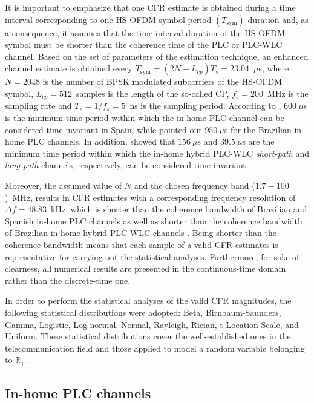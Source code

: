 \documentclass[journal]{IEEEtran}
\begin{document}
It is important to emphasize that one \ac{CFR} estimate is obtained during a time interval corresponding to one \ac{HS-OFDM} symbol period $(T_{\textrm{sym}})$ duration and, as a consequence, it assumes that the time interval duration of the \ac{HS-OFDM} symbol must be shorter than the coherence time of the \ac{PLC} or \ac{PLC}-\ac{WLC} channel. Based on the set of parameters of the estimation technique, an enhanced channel estimate is obtained every $T_{\textrm{sym}}=(2N + L_{cp}) T_s = 23.04$~$\mu$s, where $N=2048$ is the number of \ac{BPSK} modulated subcarriers of the \ac{HS-OFDM} symbol, $L_{cp}=512$~samples is the length of the so-called \ac{CP}, $f_s=200$~MHz is the sampling rate and $T_s=1/f_s=5$~ns is the sampling period. According to \cite{Canete:AIPLC}, $600~\mu$s is the minimum time period within which the in-home \ac{PLC} channel can be considered time invariant in Spain, while \cite{Thiago:Characterization} pointed out $950~\mu$s for the Brazilian in-home \ac{PLC} channels. In addition, \cite{thiago:hyb} showed that  $156~\mu$s and $39.5~\mu$s are the minimum time period within which the in-home hybrid \ac{PLC}-\ac{WLC} \textit{short-path} and \textit{long-path} channels, respectively, can be considered time invariant.

Moreover, the assumed value of $N$ and the chosen frequency band ($1.7-100$)~MHz, results in \ac{CFR} estimates with a corresponding frequency resolution of $\Delta f=48.83$~kHz, which is shorter than the coherence bandwidth of Brazilian and Spanish in-home PLC channels \cite{Canete:AIPLC,Thiago:Characterization} as well as shorter than the coherence bandwidth of Brazilian in-home hybrid \ac{PLC}-\ac{WLC} channels \cite{thiago:hyb}. Being shorter than the coherence bandwidth means that each sample of a valid \ac{CFR} estimates is representative for carrying out the statistical analyses. Furthermore, for sake of clearness, all numerical results are presented in the continuous-time domain rather than the discrete-time one.

In order to perform the statistical analyses of the valid \ac{CFR} magnitudes, the following statistical distributions were adopted: Beta, Birnbaum-Saunders, Gamma, Logistic, Log-normal, Normal, Rayleigh, Rician, t Location-Scale, and Uniform. These statistical distributions cover the well-established ones in the telecommunication field and those applied to model a random variable belonging to $\mathbb{R}_+$.

\subsection{In-home PLC channels}\label{sec:MMPLC}
\end{document}
